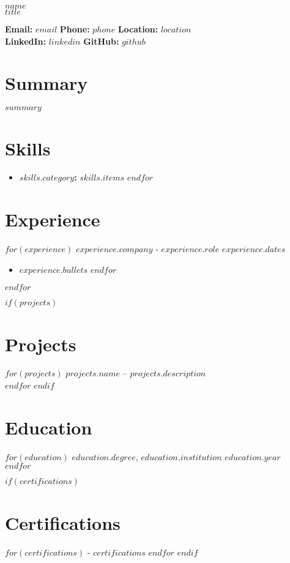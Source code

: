 \documentclass[a4paper,10pt]{article}
\begin{document}
\pagestyle{empty}

\begin{center}
    {\Huge \textbf{$name$}} \\
    {\large $title$} \\
\end{center}

\vspace{0.2cm}

\noindent
\textbf{Email:} $email$ \quad
\textbf{Phone:} $phone$ \quad
\textbf{Location:} $location$ \\
\textbf{LinkedIn:} \href{$linkedin$}{$linkedin$} \quad
\textbf{GitHub:} \href{$github$}{$github$}

\vspace{0.5cm}

\section*{Summary}
$summary$

\vspace{0.3cm}

\section*{Skills}
\begin{itemize}[leftmargin=0.5cm, itemsep=0.2cm]
$for(skills)$
    \item \textbf{$skills.category$:} $skills.items$
$endfor$
\end{itemize}

\vspace{0.3cm}

\section*{Experience}
$for(experience)$
\textbf{$experience.company$} - \textit{$experience.role$} \hfill $experience.dates$ \\
\begin{itemize}[leftmargin=0.5cm, itemsep=0.2cm]
$for(experience.bullets)$
    \item $experience.bullets$
$endfor$
\end{itemize}
\vspace{0.2cm}
$endfor$

$if(projects)$
\section*{Projects}
$for(projects)$
\textbf{$projects.name$} – $projects.description$ \\
$endfor$
$endif$

\section*{Education}
$for(education)$
\textbf{$education.degree$}, $education.institution$ \hfill $education.year$ \\
$endfor$

$if(certifications)$
\section*{Certifications}
$for(certifications)$
- $certifications$
$endfor$
$endif$
\end{document}
